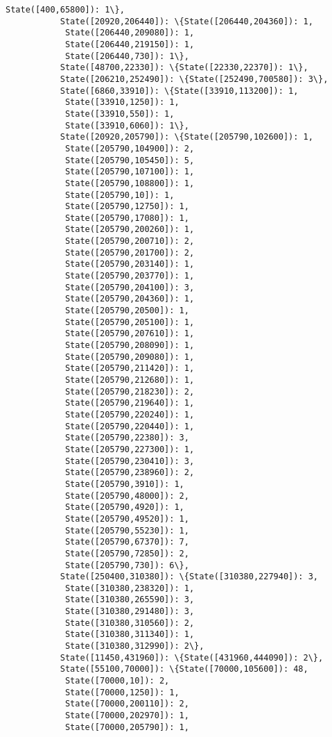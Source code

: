 \documentclass[11pt]{article}
\begin{document}
\begin{Verbatim}[commandchars=\\\{\}]
            State([400,65800]): 1\},
           State([20920,206440]): \{State([206440,204360]): 1,
            State([206440,209080]): 1,
            State([206440,219150]): 1,
            State([206440,730]): 1\},
           State([48700,22330]): \{State([22330,22370]): 1\},
           State([206210,252490]): \{State([252490,700580]): 3\},
           State([6860,33910]): \{State([33910,113200]): 1,
            State([33910,1250]): 1,
            State([33910,550]): 1,
            State([33910,6060]): 1\},
           State([20920,205790]): \{State([205790,102600]): 1,
            State([205790,104900]): 2,
            State([205790,105450]): 5,
            State([205790,107100]): 1,
            State([205790,108800]): 1,
            State([205790,10]): 1,
            State([205790,12750]): 1,
            State([205790,17080]): 1,
            State([205790,200260]): 1,
            State([205790,200710]): 2,
            State([205790,201700]): 2,
            State([205790,203140]): 1,
            State([205790,203770]): 1,
            State([205790,204100]): 3,
            State([205790,204360]): 1,
            State([205790,20500]): 1,
            State([205790,205100]): 1,
            State([205790,207610]): 1,
            State([205790,208090]): 1,
            State([205790,209080]): 1,
            State([205790,211420]): 1,
            State([205790,212680]): 1,
            State([205790,218230]): 2,
            State([205790,219640]): 1,
            State([205790,220240]): 1,
            State([205790,220440]): 1,
            State([205790,22380]): 3,
            State([205790,227300]): 1,
            State([205790,230410]): 3,
            State([205790,238960]): 2,
            State([205790,3910]): 1,
            State([205790,48000]): 2,
            State([205790,4920]): 1,
            State([205790,49520]): 1,
            State([205790,55230]): 1,
            State([205790,67370]): 7,
            State([205790,72850]): 2,
            State([205790,730]): 6\},
           State([250400,310380]): \{State([310380,227940]): 3,
            State([310380,238320]): 1,
            State([310380,265590]): 3,
            State([310380,291480]): 3,
            State([310380,310560]): 2,
            State([310380,311340]): 1,
            State([310380,312990]): 2\},
           State([11450,431960]): \{State([431960,444090]): 2\},
           State([55100,70000]): \{State([70000,105600]): 48,
            State([70000,10]): 2,
            State([70000,1250]): 1,
            State([70000,200110]): 2,
            State([70000,202970]): 1,
            State([70000,205790]): 1,

\end{Verbatim}
\end{document}
